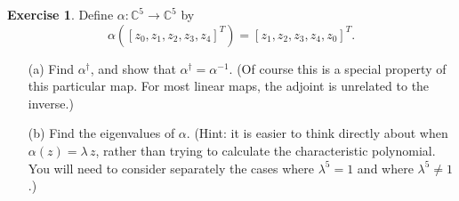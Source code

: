 \documentclass{amsart}
\newcommand{\C}         {{\mathbb{C}}}
\newcommand{\al}        {\alpha}
\newcommand{\lm}        {\lambda}
\renewcommand{\:}       {\colon}
\theoremstyle{definition}
\newtheorem{exercise}{Exercise}[section]
\begin{document}
\begin{exercise}\label{ex-unitary}
 Define $\al\:\C^5\to\C^5$ by 
 \[ \al([z_0,z_1,z_2,z_3,z_4]^T) = [z_1,z_2,z_3,z_4,z_0]^T. \]
 \begin{itemize}
  \item[(a)] Find $\al^\dag$, and show that $\al^\dag=\al^{-1}$.
   (Of course this is a special property of this particular map.  For
   most linear maps, the adjoint is unrelated to the inverse.)
  \item[(b)] Find the eigenvalues of $\al$.  (Hint: it is easier to
   think directly about when $\al(z)=\lm\,z$, rather than trying to
   calculate the characteristic polynomial.  You will need to consider
   separately the cases where $\lm^5=1$ and where $\lm^5\neq 1$.)
 \end{itemize}
\end{exercise}
\end{document}
